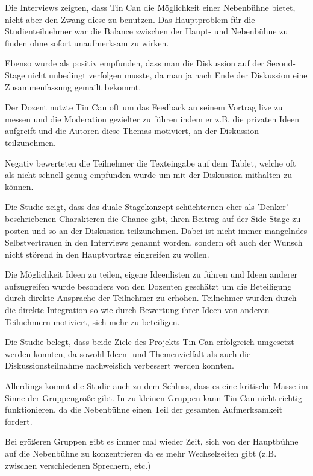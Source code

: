 Die Interviews zeigten, dass Tin Can die Möglichkeit einer Nebenbühne bietet,
nicht aber den Zwang diese zu benutzen. Das Hauptproblem für die
Studienteilnehmer war die Balance zwischen der Haupt- und Nebenbühne zu finden
ohne sofort unaufmerksam zu wirken.

Ebenso wurde als positiv empfunden, dass man die Diskussion auf der Second-Stage
nicht unbedingt verfolgen musste, da man ja nach Ende der Diskussion eine
Zusammenfassung gemailt bekommt.

Der Dozent nutzte Tin Can oft um das Feedback an seinem Vortrag live zu messen
und die Moderation gezielter zu führen indem er z.B. die privaten Ideen
aufgreift und die Autoren diese Themas motiviert, an der Diskussion teilzunehmen.

Negativ bewerteten die Teilnehmer die Texteingabe auf dem Tablet, welche oft
als nicht schnell genug empfunden wurde um mit der Diskussion mithalten zu können.

Die Studie\cite{HarGorSch2012} zeigt, dass das duale Stagekonzept schüch\-ter\-nen eher als 'Denker'
beschriebenen Charakteren die Chance gibt, ihren Beitrag auf der Side-Stage zu
posten und so an der Diskussion teilzunehmen. Dabei ist nicht immer mangelndes
Selbstvertrauen in den Interviews genannt worden, sondern oft auch der Wunsch
nicht störend in den Hauptvortrag eingreifen zu wollen.

Die Möglichkeit Ideen zu teilen, eigene Ideenlisten zu füh\-ren und Ideen
anderer aufzugreifen wurde besonders von den Dozenten geschätzt um die Beteiligung durch
direkte Ansprache der Teilnehmer zu erhöhen. Teilnehmer wurden durch die direkte
Integration so wie durch Bewertung ihrer Ideen von anderen Teilnehmern
motiviert, sich mehr zu beteiligen.

Die Studie\cite{HarGorSch2012} belegt, dass beide Ziele des Projekts Tin Can erfolgreich umgesetzt
werden konnten, da sowohl Ideen- und Themenvielfalt als auch die
Diskussionsteilnahme nachweislich verbessert werden konnten.

Allerdings kommt die Studie\cite{HarGorSch2012} auch zu dem Schluss, dass es eine kritische Masse im
Sinne der Gruppengröße gibt. In zu kleinen Gruppen kann Tin Can nicht richtig
funktionieren, da die Nebenbühne einen Teil der gesamten Aufmerksamkeit fordert.

Bei größeren Gruppen gibt es immer mal wieder Zeit, sich von der Hauptbühne auf
die Nebenbühne zu konzentrieren da es mehr Wechselzeiten gibt (z.B. zwischen
verschiedenen Sprechern, etc.)





